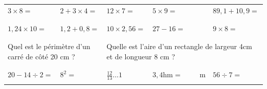 \documentclass[14]{article}
\begin{document}
    \begin{tabular}{p{3cm}|p{3cm}|p{3cm}|p{3cm}|p{3cm}}
         $3\times8=$ & $2+3\times4=$ & $12\times 7 = $ & $5\times9=$ & $89,1+10,9=$\\ 
         
         & & & &\\ \hline & & & &\\
         
         $1,24\times 10=$ & $1,2+0,8=$ & $10\times2,56=$ &  $27-16=$ & $9\times8=$\\
         
         & & & &\\ \hline \multicolumn{2}{c|}{} & \multicolumn{2}{c}{}\\
         
         \multicolumn{2}{l|}{Quel est le périmètre d'un carré de côté 20 cm ?} & 
         \multicolumn{3}{l}{Quelle est l'aire d'un rectangle de largeur 4cm et de longueur 8 cm ?}\\
         
        \multicolumn{2}{c|}{} & \multicolumn{2}{c}{} \\ \hline & & & &\\

        $20-14\div2=$ & $8^2=$ & $\frac{12}{13} \ldots 1$ & $3,4 \text{hm} = \hspace{1cm} \text{m}$ & $56\div7=$ \\

        & & & &\\ 
    \end{tabular}
\end{document}
